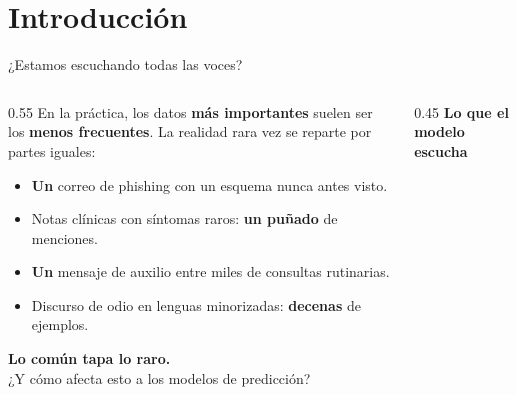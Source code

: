 
\section{Introducción}

\begin{frame}{¿Estamos escuchando todas las voces?}
\begin{columns}[T]

\begin{column}{0.55\textwidth}
\small
En la práctica, los datos \textbf{más importantes} suelen ser los \textbf{menos frecuentes}. La realidad rara vez se reparte por partes iguales:

\vspace{0.3em}
\begin{itemize}\setlength\itemsep{1pt}
  \item \textbf{Un} correo de phishing con un esquema nunca antes visto.
  \item Notas clínicas con síntomas raros: \textbf{un puñado} de menciones.
  \item \textbf{Un} mensaje de auxilio entre miles de consultas rutinarias.
  \item Discurso de odio en lenguas minorizadas: \textbf{decenas} de ejemplos.
\end{itemize}

\vspace{0.4em}
\begin{insight}
\scriptsize
\textbf{Lo común tapa lo raro.}\\
\alert{¿Y cómo afecta esto a los modelos de predicción?}
\end{insight}
\end{column}

\begin{column}{0.45\textwidth}
\centering
\vspace{0.2em}
{\scriptsize\bfseries\color{uaibluedark} Lo que el modelo escucha}

\vspace{0.3em}
\end{column}
\end{columns}
\end{frame}

